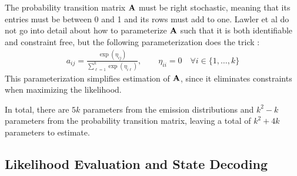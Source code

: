 The probability transition matrix $\mathbf{A}$ must be right stochastic, meaning that its entries must be between 0 and 1 and its rows must add to one. Lawler et al do not go into detail about how to parameterize $\mathbf{A}$ such that it is both identifiable and constraint free, but the following parameterization does the trick \cite{Barajas:2017}:
%
\begin{align*}
	a_{ij} = \frac{\exp(\eta_{ij})}{\sum_{\ell = 1}^k \exp(\eta_{i\ell})}, \qquad \eta_{ii} = 0 \quad \forall i \in \{1,\ldots,k\}
\end{align*}
%
This parameterization simplifies estimation of $\mathbf{A}$, since it eliminates constraints when maximizing the likelihood.

In total, there are $5k$ parameters from the emission distributions and $k^2 - k$ parameters from the probability transition matrix, leaving a total of $k^2 + 4k$ parameters to estimate.

\subsection{Likelihood Evaluation and State Decoding}

